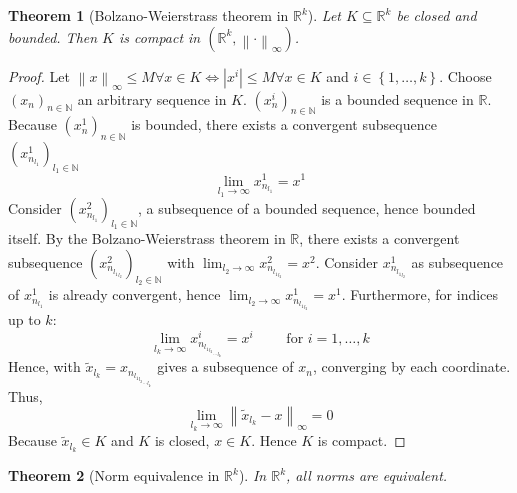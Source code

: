 \documentclass{article}
\newtheorem{theorem}{Theorem}  \numberwithin{theorem}{section}
\newcommand{\set}[1]{\left\{#1\right\}}
\newcommand{\norm}[1]{\left\|#1\right\|}
\newcommand{\card}[1]{\left|#1\right|}
\begin{document}
\begin{theorem}[Bolzano-Weierstrass theorem in $\mathbb R^k$]
  Let $K \subseteq \mathbb R^k$ be closed and bounded.
  Then $K$ is compact in $(\mathbb R^k, \norm{\cdot}_{\infty})$.
\end{theorem}

\begin{proof}
  Let $\norm{x}_{\infty} \leq M \forall x \in K \iff \card{x^i} \leq M \forall x \in K$ and $i \in \set{1, \dots, k}$.
  Choose $(x_n)_{n \in \mathbb N}$ an arbitrary sequence in $K$. $(x_n^i)_{n \in \mathbb N}$ is a bounded sequence in $\mathbb R$.
  Because $(x_n^1)_{n \in \mathbb N}$ is bounded, there exists a convergent subsequence $\left(x_{n_{l_1}}^1\right)_{l_1 \in \mathbb N}$
  \[ \lim_{l_1 \to \infty} x_{n_{l_1}}^1 = x^1 \]
  Consider $(x_{n_{l_1}}^2)_{l_1 \in \mathbb N}$, a subsequence of a bounded sequence, hence bounded itself.
  By the Bolzano-Weierstrass theorem in $\mathbb R$, there exists a convergent subsequence $(x_{n_{{l_1}_{l_2}}}^2)_{l_2 \in \mathbb N}$ with $\lim_{l_2 \to \infty} x_{n_{{l_1}_{l_2}}}^2 = x^2$.
  Consider $x_{n_{{l_1}_{l_2}}}^1$ as subsequence of $x_{n_{l_1}}^1$ is already convergent, hence $\lim_{l_2 \to \infty} x_{n_{{l_1}_{l_2}}}^1 = x^1$. Furthermore, for indices up to $k$:
  \[ \lim_{l_k \to \infty} x^i_{n_{{{{l_1}_{l_2}}_{\ldots}}_{l_k}}} = x^i \qquad \text{ for } i = 1, \dots, k \]
  Hence, with $\tilde{x}_{l_k} = x_{n_{{{{l_1}_{l_2}}_{\ldots}}_{l_k}}}$ gives a subsequence of $x_n$, converging by each coordinate. Thus,
  \[ \lim_{l_k \to \infty} \norm{\tilde{x}_{l_k} - x}_{\infty} = 0 \]
  Because $\tilde{x}_{l_k} \in K$ and $K$ is closed, $x \in K$.
  Hence $K$ is compact.
\end{proof}

\begin{theorem}[Norm equivalence in $\mathbb R^k$] %
  In $\mathbb R^k$, all norms are equivalent.
\end{theorem}
\end{document}
